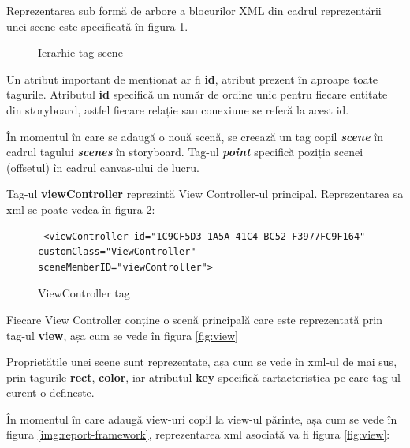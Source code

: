 Reprezentarea sub formă de arbore a blocurilor XML din cadrul reprezentării unei scene este specificată în figura \ref{fig:sceneIerarhie}.

\begin{figure}[!htbp]
\caption{Ierarhie tag scene}\label{fig:sceneIerarhie}
\end{figure}

Un atribut important de menționat ar fi \textbf{id}, atribut prezent în aproape toate tagurile. Atributul \textbf{id} specifică un număr de ordine unic pentru fiecare entitate din storyboard, astfel fiecare relație sau conexiune se referă la acest id.

În momentul în care se adaugă o nouă scenă, se creează un tag copil \textbf{\textit{scene}} în cadrul tagului \textbf{\textit{scenes}} în storyboard. Tag-ul \textbf{\textit{point}} specifică poziția scenei (offsetul) în cadrul canvas-ului de lucru.

Tag-ul \textbf{viewController} reprezintă View Controller-ul principal. Reprezentarea sa xml se poate vedea în figura \ref{fig:viewController}:

\begin{figure}[!htbp]
\lstset{language=XML}
\begin{lstlisting}
 <viewController id="1C9CF5D3-1A5A-41C4-BC52-F3977FC9F164" customClass="ViewController" sceneMemberID="viewController">
\end{lstlisting}
\caption{ViewController tag}\label{fig:viewController}
\end{figure}

Fiecare View Controller conține o scenă principală care este reprezentată prin tag-ul \textbf{view}, așa cum se vede în figura \ref{fig:view}

Proprietățile unei scene sunt reprezentate, așa cum se vede în xml-ul de mai sus, prin tagurile \textbf{rect}, \textbf{color}, iar atributul \textbf{key} specifică cartacteristica pe care tag-ul curent o definește.

În momentul în care adaugă view-uri copil la view-ul părinte, așa cum se vede în figura \ref{img:report-framework}, reprezentarea xml asociată va fi figura \ref{fig:view}:

